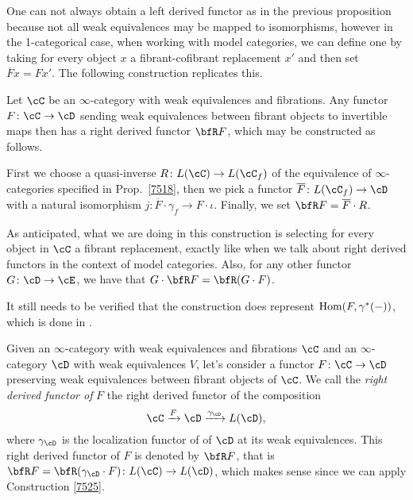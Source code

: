 One can not always obtain a left derived functor as in the previous proposition
because not all weak equivalences may be mapped to isomorphisms,
however in the 1-categorical case, when working with model categories, we can
define one by taking for every object $x$ a fibrant-cofibrant replacement $x'$
and then set $\overline{F}x=Fx'$. The following construction replicates this.

\begin{construction}\label{7525}
  Let $\cC$ be an $\infty$-category with weak equivalences and fibrations. Any
  functor $F\colon\cC\rightarrow\cD$ sending weak equivalences between fibrant
  objects to invertible maps then has a right derived functor $\bfR F$, which
  may be constructed as follows.

  First we choose a quasi-inverse $R\colon L(\cC)\rightarrow L(\cC_f)$ of the
  equivalence of $\infty$-categories specified in Prop.\ \ref{7518}, then we
  pick a functor $\overline{F}\colon L(\cC_f)\rightarrow\cD$ with a natural
  isomorphism $j\colon\overline{F}\cdot\gamma_f\rightarrow F\cdot\iota$.
  Finally, we set $\bfR F=\overline{F}\cdot R$.

  As anticipated, what we are doing in this construction is selecting
  for every object in $\cC$ a fibrant replacement, exactly like when we talk
  about right derived functors in the context of model categories.
  Also, for any other functor $G\colon\cD\rightarrow\cE$, we have that
  $G\cdot\bfR F=\bfR(G\cdot F)$.

  It still needs to be verified that the construction does represent
  $\operatorname{Hom}(F,\gamma^*(-))$, which is done in \cite[Rem.\ 7.5.25]{Cis19}.
\end{construction}

\begin{defn}
  Given an $\infty$-category with weak equivalences and fibrations $\cC$ and an
  $\infty$-category $\cD$ with weak equivalences $V$, let's consider a functor
  $F\colon\cC\rightarrow\cD$ preserving weak equivalences between fibrant
  objects of $\cC$. We call the \emph{right derived functor of} $F$ the right
  derived functor of the composition
  \[\cC\xrightarrow{F}\cD\xrightarrow{\gamma_{\cD}}L(\cD),\]
  where $\gamma_\cD$ is the localization functor of of $\cD$ at its weak
  equivalences. This right derived functor of $F$ is denoted by $\bfR F$, that
  is $\bfR F=\bfR(\gamma_{\cD}\cdot F)\colon L(\cC)\rightarrow L(\cD)$, which
  makes sense since we can apply Construction \ref{7525}.
\end{defn}

